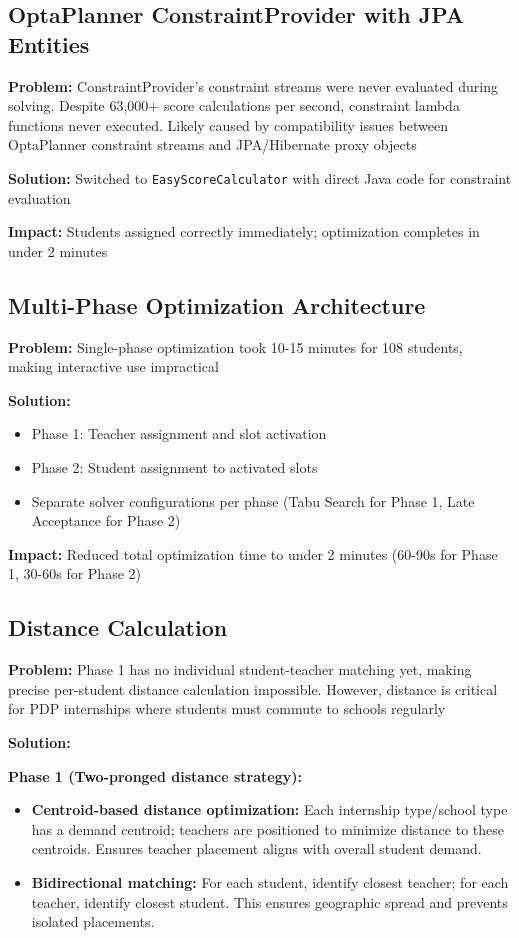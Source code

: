 \documentclass[12pt,a4paper]{report}
\begin{document}
\subsection{OptaPlanner ConstraintProvider with JPA Entities}

\textbf{Problem:} ConstraintProvider's constraint streams were never evaluated during solving. Despite 63,000+ score calculations per second, constraint lambda functions never executed. Likely caused by compatibility issues between OptaPlanner constraint streams and JPA/Hibernate proxy objects

\textbf{Solution:} Switched to \texttt{EasyScoreCalculator} with direct Java code for constraint evaluation

\textbf{Impact:} Students assigned correctly immediately; optimization completes in under 2 minutes

\subsection{Multi-Phase Optimization Architecture}

\textbf{Problem:} Single-phase optimization took 10-15 minutes for 108 students, making interactive use impractical

\textbf{Solution:} 
\begin{itemize}
    \item Phase 1: Teacher assignment and slot activation
    \item Phase 2: Student assignment to activated slots
    \item Separate solver configurations per phase (Tabu Search for Phase 1, Late Acceptance for Phase 2)
\end{itemize}

\textbf{Impact:} Reduced total optimization time to under 2 minutes (60-90s for Phase 1, 30-60s for Phase 2)

\subsection{Distance Calculation}

\textbf{Problem:} Phase 1 has no individual student-teacher matching yet, making precise per-student distance calculation impossible. However, distance is critical for PDP internships where students must commute to schools regularly

\textbf{Solution:} 

\textbf{Phase 1 (Two-pronged distance strategy):}
\begin{itemize}
    \item \textbf{Centroid-based distance optimization:} Each internship type/school type has a demand centroid; teachers are positioned to minimize distance to these centroids. Ensures teacher placement aligns with overall student demand.
    
    \item \textbf{Bidirectional matching:} For each student, identify closest teacher; for each teacher, identify closest student. This ensures geographic spread and prevents isolated placements.
\end{itemize}
\end{document}
